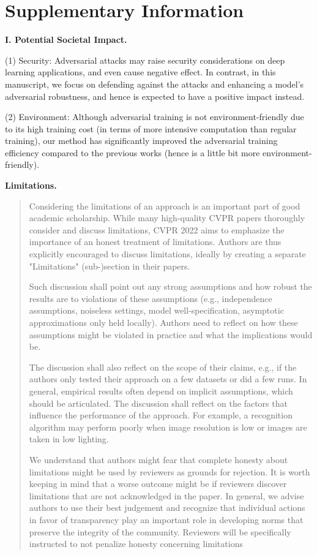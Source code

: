 \clearpage
\appendix

\section{Supplementary Information}

\noindent\textbf{I. Potential Societal Impact.}

(1) Security: Adversarial attacks may raise security considerations on deep
learning applications, and even cause negative effect.
%
In contrast, in this manuscript, we focus on defending against the attacks and
enhancing a model's adversarial robustness, and hence is expected to have a
positive impact instead.

(2) Environment: Although adversarial training is not environment-friendly due
to its high training cost (in terms of more intensive computation than regular
training), our method has significantly improved the adversarial training
efficiency compared to the previous works (hence is a little bit more
environment-friendly).

\textbf{Limitations.}
%
\begin{quote}

Considering the limitations of an approach is an important part of good
academic scholarship. While many high-quality CVPR papers thoroughly consider
and discuss limitations, CVPR 2022 aims to emphasize the importance of an
honest treatment of limitations. Authors are thus explicitly encouraged to
discuss limitations, ideally by creating a separate "Limitations" (sub-)section
in their papers.

Such discussion shall point out any strong assumptions and how robust the
results are to violations of these assumptions (e.g., independence assumptions,
noiseless settings, model well-specification, asymptotic approximations only
held locally). Authors need to reflect on how these assumptions might be
violated in practice and what the implications would be.

The discussion shall also reflect on the scope of their claims, e.g., if the
authors only tested their approach on a few datasets or did a few runs. In
general, empirical results often depend on implicit assumptions, which should
be articulated. The discussion shall reflect on the factors that influence the
performance of the approach. For example, a recognition algorithm may perform
poorly when image resolution is low or images are taken in low lighting.

We understand that authors might fear that complete honesty about limitations
might be used by reviewers as grounds for rejection. It is worth keeping in
mind that a worse outcome might be if reviewers discover limitations that are
not acknowledged in the paper. In general, we advise authors to use their best
judgement and recognize that individual actions in favor of transparency play
an important role in developing norms that preserve the integrity of the
community. Reviewers will be specifically instructed to not penalize honesty
concerning limitations

\end{quote}


